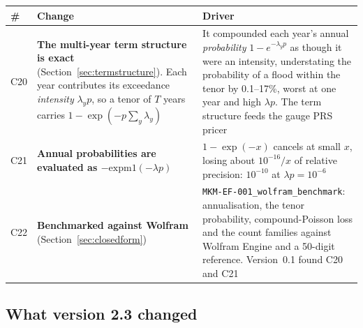 \documentclass[11pt]{article}
\begin{document}
\begin{longtable}{@{}p{}p{}p{}@{}}
\toprule
\textbf{\#} & \textbf{Change} & \textbf{Driver} \\
\midrule
\endhead
C20 & \textbf{The multi-year term structure is exact}
(Section~\ref{sec:termstructure}). Each year contributes its exceedance
\emph{intensity} $\lambda_y p$, so a tenor of $T$ years carries
$1-\exp(-p\sum_y\lambda_y)$ & It compounded each year's annual
\emph{probability} $1-e^{-\lambda_y p}$ as though it were an intensity,
understating the probability of a flood within the tenor by 0.1--17\%, worst at
one year and high $\lambda p$. The term structure feeds the gauge PRS pricer \\
\addlinespace
C21 & \textbf{Annual probabilities are evaluated as $-\mathrm{expm1}(-\lambda p)$}
& $1-\exp(-x)$ cancels at small $x$, losing about $10^{-16}/x$ of relative
precision: $10^{-10}$ at $\lambda p=10^{-6}$ \\
\addlinespace
C22 & \textbf{Benchmarked against Wolfram} (Section~\ref{sec:closedform}) &
\texttt{MKM-EF-001\_wolfram\_benchmark}: annualisation, the tenor probability,
compound-Poisson loss and the count families against Wolfram Engine and a
50-digit reference. Version~0.1 found C20 and C21 \\
\bottomrule
\end{longtable}

\subsection{What version 2.3 changed}
\end{document}
